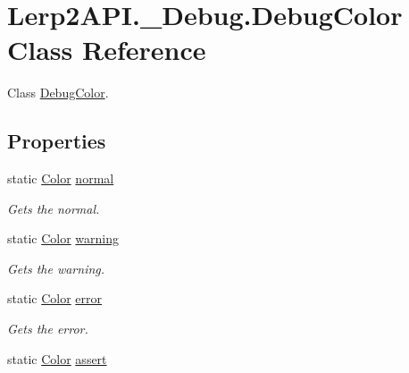 \hypertarget{class_lerp2_a_p_i_1_1___debug_1_1_debug_color}{}\section{Lerp2\+A\+P\+I.\+\_\+\+Debug.\+Debug\+Color Class Reference}
\label{class_lerp2_a_p_i_1_1___debug_1_1_debug_color}


Class \hyperlink{class_lerp2_a_p_i_1_1___debug_1_1_debug_color}{Debug\+Color}.  


\subsection*{Properties}
\begin{DoxyCompactItemize}
\item 
static \hyperlink{struct_lerp2_a_p_i_1_1_optimizers_1_1_color}{Color} \hyperlink{class_lerp2_a_p_i_1_1___debug_1_1_debug_color_a9fde10bbf4994e1ccfae1faeb39334e4}{normal}
\begin{DoxyCompactList}\small\item\em Gets the normal. \end{DoxyCompactList}\item 
static \hyperlink{struct_lerp2_a_p_i_1_1_optimizers_1_1_color}{Color} \hyperlink{class_lerp2_a_p_i_1_1___debug_1_1_debug_color_ae6c20989f1716185acc88fa8535ec1bc}{warning}
\begin{DoxyCompactList}\small\item\em Gets the warning. \end{DoxyCompactList}\item 
static \hyperlink{struct_lerp2_a_p_i_1_1_optimizers_1_1_color}{Color} \hyperlink{class_lerp2_a_p_i_1_1___debug_1_1_debug_color_abc682d7d7c9264aaacb12f43c329f7b4}{error}
\begin{DoxyCompactList}\small\item\em Gets the error. \end{DoxyCompactList}\item 
static \hyperlink{struct_lerp2_a_p_i_1_1_optimizers_1_1_color}{Color} \hyperlink{class_lerp2_a_p_i_1_1___debug_1_1_debug_color_a82da989feb2461fe9716edca87ce8fac}{assert}

\end{DoxyCompactItemize}
